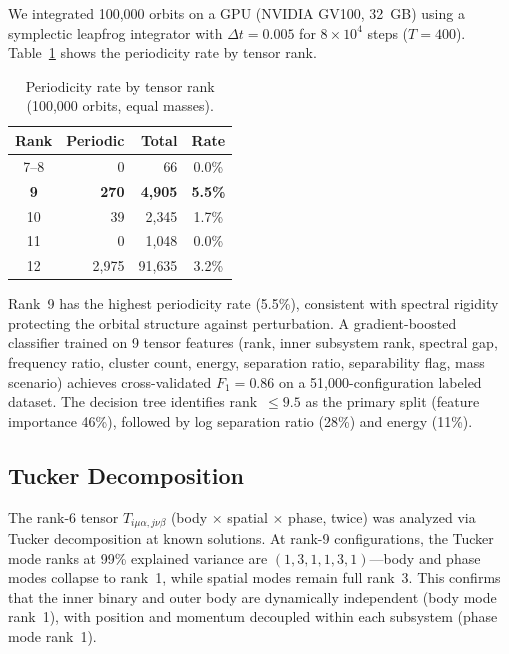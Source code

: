 \documentclass[aps,pre,twocolumn,superscriptaddress,floatfix]{revtex4-2}
\begin{document}
We integrated 100{,}000 orbits on a GPU (NVIDIA GV100, 32~GB) using
a symplectic leapfrog integrator with $\Delta t = 0.005$ for
$8 \times 10^4$ steps ($T = 400$). Table~\ref{tab:orbits} shows
the periodicity rate by tensor rank.

\begin{table}[h]
\caption{Periodicity rate by tensor rank (100{,}000 orbits, equal masses).}
\label{tab:orbits}
\begin{ruledtabular}
\begin{tabular}{crrc}
Rank & Periodic & Total & Rate \\
\hline
7--8 & 0 & 66 & 0.0\% \\
\textbf{9} & \textbf{270} & \textbf{4{,}905} & \textbf{5.5\%} \\
10 & 39 & 2{,}345 & 1.7\% \\
11 & 0 & 1{,}048 & 0.0\% \\
12 & 2{,}975 & 91{,}635 & 3.2\% \\
\end{tabular}
\end{ruledtabular}
\end{table}

Rank~9 has the highest periodicity rate (5.5\%), consistent with
spectral rigidity protecting the orbital structure against perturbation.
A gradient-boosted classifier trained on 9 tensor features (rank,
inner subsystem rank, spectral gap, frequency ratio, cluster count,
energy, separation ratio, separability flag, mass scenario) achieves
cross-validated $F_1 = 0.86$ on a 51{,}000-configuration labeled dataset.
The decision tree identifies rank~$\leq 9.5$ as the primary split
(feature importance 46\%), followed by log separation ratio (28\%)
and energy (11\%).

\subsection{Tucker Decomposition}

The rank-6 tensor $T_{i\mu\alpha,j\nu\beta}$ (body $\times$ spatial
$\times$ phase, twice) was analyzed via Tucker decomposition at known
solutions. At rank-9 configurations, the Tucker mode ranks at 99\%
explained variance are $(1, 3, 1, 1, 3, 1)$---body and phase modes
collapse to rank~1, while spatial modes remain full rank~3. This
confirms that the inner binary and outer body are dynamically
independent (body mode rank~1), with position and momentum decoupled
within each subsystem (phase mode rank~1).
\end{document}
